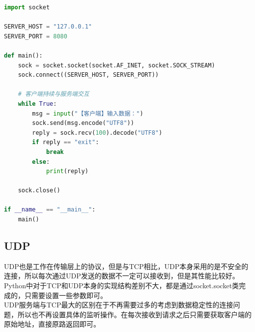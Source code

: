 \begin{lstlisting}[language=Python, title=tcp\_client.py]
import socket

SERVER_HOST = "127.0.0.1"
SERVER_PORT = 8080

def main():
	sock = socket.socket(socket.AF_INET, socket.SOCK_STREAM)
	sock.connect((SERVER_HOST, SERVER_PORT))

	# 客户端持续与服务端交互
	while True:     
		msg = input("【客户端】输入数据：")
		sock.send(msg.encode("UTF8"))
		reply = sock.recv(100).decode("UTF8")
		if reply == "exit":
			break
		else:
			print(reply)

	sock.close()

if __name__ == "__main__":
	main()
\end{lstlisting}

\vspace{0.5cm}

\subsection{UDP}

UDP也是工作在传输层上的协议，但是与TCP相比，UDP本身采用的是不安全的连接，所以每次通过UDP发送的数据不一定可以接收到，但是其性能比较好。\\

Python中对于TCP和UDP本身的实现结构差别不大，都是通过socket.socket类完成的，只需要设置一些参数即可。\\

UDP服务端与TCP最大的区别在于不再需要过多的考虑到数据稳定性的连接问题，所以也不再设置具体的监听操作。在每次接收到请求之后只需要获取客户端的原始地址，直接原路返回即可。

\newpage